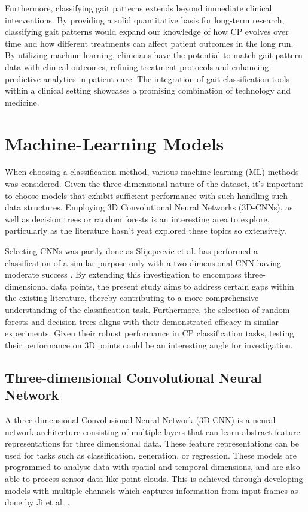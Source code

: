 \documentclass[UKenglish]{uiomasterthesis}
\begin{document}
Furthermore, classifying gait patterns extends beyond immediate clinical interventions. By providing a solid quantitative basis for long-term research, classifying gait patterns would expand our knowledge of how CP evolves over time and how different treatments can affect patient outcomes in the long run. By utilizing machine learning, clinicians have the potential to match gait pattern data with clinical outcomes, refining treatment protocols and enhancing predictive analytics in patient care. The integration of gait classification tools within a clinical setting showcases a promising combination of technology and medicine.

\section{Machine-Learning Models}
When choosing a classification method, various machine learning (ML) methods was considered. Given the three-dimensional nature of the dataset, it's important to choose models that exhibit sufficient performance with such handling such data structures. Employing 3D Convolutional Neural Networks (3D-CNNs), as well as decision trees or random forests is an interesting area to explore, particularly as the literature hasn't yeat explored these topics so extensively.

Selecting CNNs was partly done as Slijepcevic et al. has performed a classification of a similar purpose only with a two-dimensional CNN having moderate success \cite{slijepcevic_explainable_2023}. By extending this investigation to encompass three-dimensional data points, the present study aims to address certain gaps within the existing literature, thereby contributing to a more comprehensive understanding of the classification task.
Furthermore, the selection of random forests and decision trees aligns with their demonstrated efficacy in similar experiments. Given their robust performance in CP classification tasks, testing their performance on 3D points could be an interesting angle for investigation. 

\subsection{Three-dimensional Convolutional Neural Network}
A three-dimensional Convolusional Neural Network (3D CNN) is a neural network architecture consisting of multiple layers that can learn abstract feature representations for three dimensional data. These feature representations can be used for tasks such as classification, generation, or regression. These models are programmed to analyse data with spatial and temporal dimensions, and are also able to process sensor data like point clouds. This is achieved through developing models with multiple channels which captures information from input frames as done by Ji et al. \cite{ji_3d_2013}.  
\end{document}
